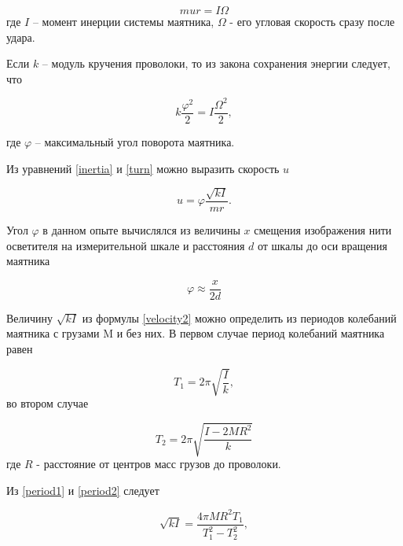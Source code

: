 \documentclass[a4paper,12pt]{article} %
\begin{document}
\begin{equation}
    mur=I\Omega
    \label{inertia}
\end{equation}
где $I$ -- момент инерции системы маятника, $ \Omega $ - его угловая скорость сразу после удара.

Если $k$ -- модуль кручения проволоки, то из закона сохранения энергии следует, что

\begin{equation}
k \frac{\varphi^2}{2} = I \frac{\Omega^2}{2},
\label{turn}
\end{equation}

где $\varphi$ -- максимальный угол поворота маятника.

Из уравнений \eqref{inertia} и \eqref{turn} можно выразить скорость $u$

\begin{equation}
u = \varphi \frac{\sqrt{kI}}{mr}.
\label{velocity2}
\end{equation}

Угол $ \varphi $ в данном опыте вычислялся из величины $ x $ смещения изображения нити осветителя на измерительной шкале и расстояния $d$ от шкалы до оси вращения маятника

\begin{equation}
    \varphi \approx \frac{x}{2d}
\end{equation}

Величину $ \sqrt{kI} $ из формулы \eqref{velocity2} можно определить из периодов колебаний маятника с грузами M и без них. В первом случае период колебаний маятника равен

\begin{equation}
    T_1=2\pi\sqrt{\frac{I}{k}},
    \label{period1}
\end{equation}
во втором случае

\begin{equation}
    T_2=2\pi\sqrt{\frac{I - 2MR^2}{k}}
    \label{period2}
\end{equation}
где $ R $ - расстояние от центров масс грузов до проволоки.

Из \eqref{period1} и \eqref{period2} следует

\begin{equation}
    \sqrt{kI}=\frac{4\pi MR^2T_1}{T_{1}^2-T_{2}^2},
\end{equation}
\end{document}
